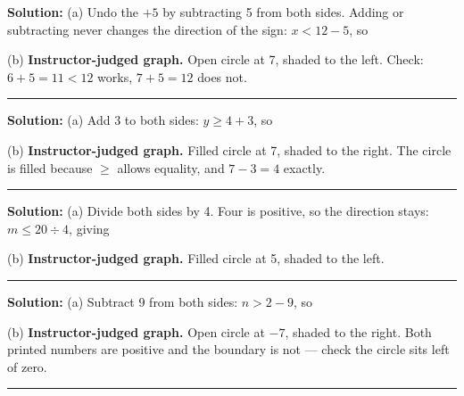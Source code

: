 \documentclass[12pt]{article}
\begin{document}




\textbf{Solution:} (a) Undo the $+5$ by subtracting 5 from both sides. Adding or subtracting never changes the direction of the sign: $x < 12 - 5$, so 

(b) \textbf{Instructor-judged graph.} Open circle at 7, shaded to the left. Check: $6 + 5 = 11 < 12$ works, $7 + 5 = 12$ does not.

\vspace{0.2cm}\noindent\rule{\linewidth}{0.2pt}\vspace{0.2cm}


\textbf{Solution:} (a) Add 3 to both sides: $y \geq 4 + 3$, so 

(b) \textbf{Instructor-judged graph.} Filled circle at 7, shaded to the right. The circle is filled because $\geq$ allows equality, and $7 - 3 = 4$ exactly.

\vspace{0.2cm}\noindent\rule{\linewidth}{0.2pt}\vspace{0.2cm}


\textbf{Solution:} (a) Divide both sides by 4. Four is positive, so the direction stays: $m \leq 20 \div 4$, giving 

(b) \textbf{Instructor-judged graph.} Filled circle at 5, shaded to the left.

\vspace{0.2cm}\noindent\rule{\linewidth}{0.2pt}\vspace{0.2cm}


\textbf{Solution:} (a) Subtract 9 from both sides: $n > 2 - 9$, so 

(b) \textbf{Instructor-judged graph.} Open circle at $-7$, shaded to the right. Both printed numbers are positive and the boundary is not --- check the circle sits left of zero.

\vspace{0.2cm}\noindent\rule{\linewidth}{0.2pt}\vspace{0.2cm}

\end{document}
